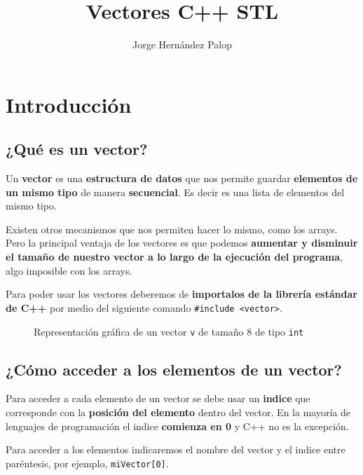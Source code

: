 \documentclass{article}
\title{Vectores C++ STL}
\author{Jorge Hernández Palop}
\begin{document}
    \maketitle
    \section{Introducción}
    \subsection{¿Qué es un vector?}

    Un \textbf{vector} es una \textbf{estructura de datos} que nos permite guardar \textbf{elementos de un mismo
    tipo} de manera \textbf{secuencial}. Es decir es una lista de elementos del mismo tipo. 

    Existen otros mecanismos que nos permiten hacer lo mismo, como los arrays. Pero la principal ventaja
    de los vectores es que podemos \textbf{aumentar y disminuir el tamaño de nuestro vector a lo largo de 
    la ejecución del programa}, algo imposible con los arrays.

    Para poder usar los vectores deberemos de \textbf{importalos de la librería estándar de C++} 
    por medio del siguiente comando \texttt{\#include <vector>}.
    
    \begin{figure}[h]
        \centering
        \caption{Representación gráfica de un vector \texttt{v} de tamaño 8  de tipo \texttt{int}}
    \end{figure}

    \subsection{¿Cómo acceder a los elementos de un vector?}


    Para acceder a cada elemento de un vector se debe usar un \textbf{indice} que corresponde con la \textbf{posición
    del elemento} dentro del vector. En la mayoría de lenguajes de programación el indice \textbf{comienza en 0}
    y C++ no es la excepción.
    
    Para acceder a los elementos indicaremos el nombre del vector y el indice entre paréntesis,
    por ejemplo, \texttt{miVector[0]}.
\end{document}
